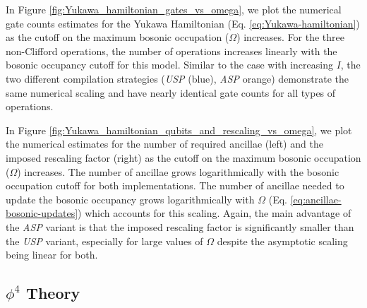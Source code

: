 In Figure \ref{fig:Yukawa_hamiltonian_gates_vs_omega}, we plot the numerical gate counts estimates for the Yukawa Hamiltonian (Eq. \ref{eq:Yukawa-hamiltonian}) as the cutoff on the maximum bosonic occupation ($\Omega$) increases.
For the three non-Clifford operations, the number of operations increases linearly with the bosonic occupancy cutoff for this model.
Similar to the case with increasing $I$, the two different compilation strategies (\textit{USP} (blue), \textit{ASP} orange) demonstrate the same numerical scaling and have nearly identical gate counts for all types of operations.

In Figure \ref{fig:Yukawa_hamiltonian_qubits_and_rescaling_vs_omega}, we plot the numerical estimates for the number of required ancillae (left) and the imposed rescaling factor (right) as the cutoff on the maximum bosonic occupation ($\Omega$) increases.
The number of ancillae grows logarithmically with the bosonic occupation cutoff for both implementations.
The number of ancillae needed to update the bosonic occupancy grows logarithmically with $\Omega$ (Eq. \ref{eq:ancillae-bosonic-updates}) which accounts for this scaling.
Again, the main advantage of the \textit{ASP} variant is that the imposed rescaling factor is significantly smaller than the \textit{USP} variant, especially for large values of $\Omega$ despite the asymptotic scaling being linear for both.


\subsection{$\phi^4$ Theory}
